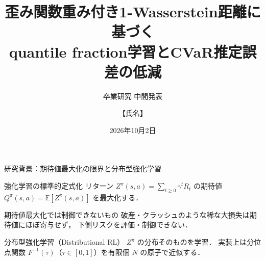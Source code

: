 \documentclass[aspectratio=169, 10pt]{beamer}
\title[歪み重み付き$W_1$によるquantile fraction学習]{歪み関数重み付き1-Wasserstein距離に基づく\texorpdfstring{\\}{ }quantile fraction学習とCVaR推定誤差の低減}
\subtitle{卒業研究 中間発表}
\author[【氏名】]{【氏名】}
\institute[【研究室名】]{【研究室名】\\ 指導教員：【指導教員名】}
\date{2026年10月2日}
\newcommand{\blue}[1]{\textcolor{blue!80!black}{#1}}
\providecommand{\Finv}{}\renewcommand{\Finv}{F^{-1}}
\newcommand{\E}{\mathbb{E}}
\begin{document}
\begin{frame}[plain]
  \titlepage
\end{frame}

\begin{frame}{研究背景：期待値最大化の限界と分布型強化学習}
  \begin{block}{強化学習の標準的定式化}
    リターン $Z^\pi(s,a)=\sum_{t\ge 0}\gamma^t R_t$ の期待値 $Q^\pi(s,a)=\E[Z^\pi(s,a)]$ を最大化する．
  \end{block}
  \begin{alertblock}{期待値最大化では制御できないもの}
    破産・クラッシュのような\alert{稀な大損失}は期待値にほぼ寄与せず，
    \alert{下側リスク}を評価・制御できない．
  \end{alertblock}
  \begin{block}{分布型強化学習（Distributional RL）}
    $Z^\pi$ の\alert{分布そのもの}を学習．
    実装上は分位点関数 $\Finv(\tau)$（$\tau\in[0,1]$）を\blue{有限個 $N$ の原子}で近似する．
  \end{block}
\end{frame}
\end{document}
